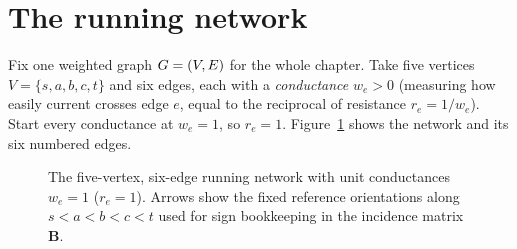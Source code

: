 \chapterline

\section{The running network}\label{ch41:running}

Fix one weighted graph $G = (V, E)$ for the whole chapter. Take five vertices $V = \{s,a,b,c,t\}$ and six edges, each with a \emph{conductance} $w_e > 0$ (measuring how easily current crosses edge $e$, equal to the reciprocal of resistance $r_e = 1/w_e$). Start every conductance at $w_e = 1$, so $r_e = 1$. Figure~\ref{ch41:fig-running} shows the network and its six numbered edges.

\begin{figure}[htbp]
\centering
{}
\caption{The five-vertex, six-edge running network with unit conductances $w_e = 1$ ($r_e = 1$). Arrows show the fixed reference orientations along $s < a < b < c < t$ used for sign bookkeeping in the incidence matrix $\mathbf{B}$.}
\label{ch41:fig-running}
\end{figure}

